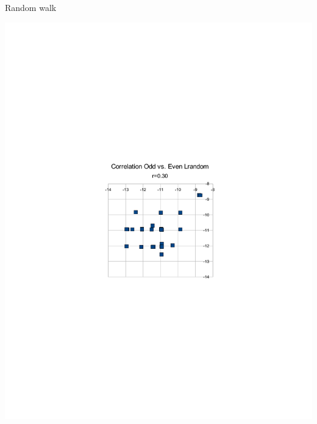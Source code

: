 \documentclass[xcolor=table]{beamer}
\begin{document}
\begin{frame}{Random walk}
\centerline{
 \includegraphics[trim= 10cm 10cm 10cm 10cm,height=.8\textheight]{lrandom.pdf}}
\end{frame}
\end{document}
